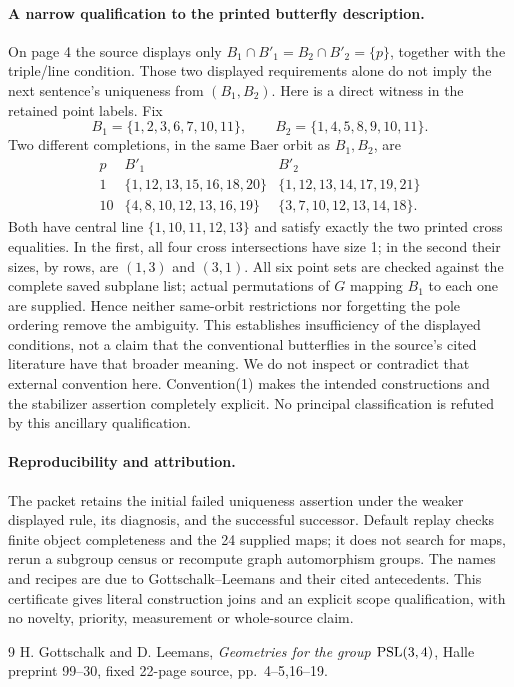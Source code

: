 \documentclass[11pt]{article}
\begin{document}
\paragraph{A narrow qualification to the printed butterfly description.}
On page 4 the source displays only
$B_1\cap B'_1=B_2\cap B'_2=\{p\}$, together with the triple/line
condition. Those two displayed requirements alone do not imply the next
sentence's uniqueness from $(B_1,B_2)$. Here is a direct witness in the
retained point labels. Fix
\[
 B_1=\{1,2,3,6,7,10,11\},\qquad B_2=\{1,4,5,8,9,10,11\}.
\]
Two different completions, in the same Baer orbit as $B_1,B_2$, are
\[
\begin{array}{c|l|l}
p&B'_1&B'_2\\\hline
1&\{1,12,13,15,16,18,20\}&\{1,12,13,14,17,19,21\}\\
10&\{4,8,10,12,13,16,19\}&\{3,7,10,12,13,14,18\}.
\end{array}
\]
Both have central line $\{1,10,11,12,13\}$ and satisfy exactly the two
printed cross equalities. In the first, all four cross intersections have
size 1; in the second their sizes, by rows, are $(1,3)$ and $(3,1)$.
All six point sets are checked against the complete saved subplane list;
actual permutations of $G$ mapping $B_1$ to each one are supplied. Hence
neither same-orbit restrictions nor forgetting the pole ordering remove
the ambiguity. This establishes insufficiency of the displayed conditions,
not a claim that the conventional butterflies in the source's cited
literature have that broader meaning. We do not inspect or contradict that
external convention here. Convention(1) makes the intended constructions
and the stabilizer assertion completely explicit. No principal
classification is refuted by this ancillary qualification.

\paragraph{Reproducibility and attribution.}
The packet retains the initial failed uniqueness assertion under the weaker
displayed rule, its diagnosis, and the successful successor. Default replay
checks finite object completeness and the 24 supplied maps; it does not
search for maps, rerun a subgroup census or recompute graph automorphism
groups. The names and recipes are due to Gottschalk--Leemans and their cited
antecedents. This certificate gives literal construction joins and an explicit
scope qualification, with no novelty, priority, measurement or whole-source claim.
\begin{thebibliography}{9}
 H. Gottschalk and D. Leemans, \emph{Geometries for the group
$\operatorname{PSL}(3,4)$}, Halle preprint 99--30, fixed 22-page source, pp.~4--5,16--19.
\end{thebibliography}
\end{document}
